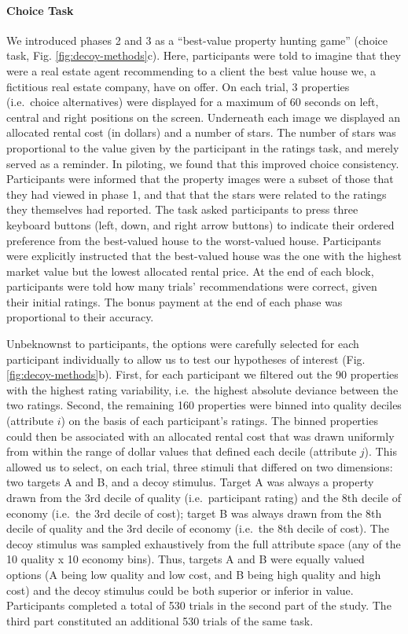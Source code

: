 \documentclass[a4paper, nobind]{templates/ociamthesis}
\begin{document}
\hypertarget{choice-task}{%
\paragraph{Choice Task}\label{choice-task}}

We introduced phases 2 and 3 as a ``best-value property hunting game'' (choice task, Fig. \ref{fig:decoy-methods}c). Here, participants were told to imagine that they were a real estate agent recommending to a client the best value house we, a fictitious real estate company, have on offer. On each trial, 3 properties (i.e.~choice alternatives) were displayed for a maximum of 60 seconds on left, central and right positions on the screen. Underneath each image we displayed an allocated rental cost (in dollars) and a number of stars. The number of stars was proportional to the value given by the participant in the ratings task, and merely served as a reminder. In piloting, we found that this improved choice consistency. Participants were informed that the property images were a subset of those that they had viewed in phase 1, and that that the stars were related to the ratings they themselves had reported. The task asked participants to press three keyboard buttons (left, down, and right arrow buttons) to indicate their ordered preference from the best-valued house to the worst-valued house. Participants were explicitly instructed that the best-valued house was the one with the highest market value but the lowest allocated rental price. At the end of each block, participants were told how many trials' recommendations were correct, given their initial ratings. The bonus payment at the end of each phase was proportional to their accuracy.

Unbeknownst to participants, the options were carefully selected for each participant individually to allow us to test our hypotheses of interest (Fig. \ref{fig:decoy-methods}b). First, for each participant we filtered out the 90 properties with the highest rating variability, i.e.~the highest absolute deviance between the two ratings. Second, the remaining 160 properties were binned into quality deciles (attribute \(i\)) on the basis of each participant's ratings. The binned properties could then be associated with an allocated rental cost that was drawn uniformly from within the range of dollar values that defined each decile (attribute \(j\)). This allowed us to select, on each trial, three stimuli that differed on two dimensions: two targets A and B, and a decoy stimulus. Target A was always a property drawn from the 3rd decile of quality (i.e.~participant rating) and the 8th decile of economy (i.e.~the 3rd decile of cost); target B was always drawn from the 8th decile of quality and the 3rd decile of economy (i.e.~the 8th decile of cost). The decoy stimulus was sampled exhaustively from the full attribute space (any of the 10 quality x 10 economy bins). Thus, targets A and B were equally valued options (A being low quality and low cost, and B being high quality and high cost) and the decoy stimulus could be both superior or inferior in value. Participants completed a total of 530 trials in the second part of the study. The third part constituted an additional 530 trials of the same task.
\end{document}
